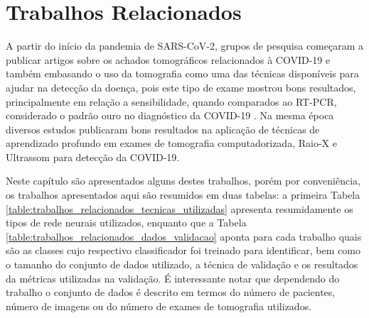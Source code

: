 \chapter{Trabalhos Relacionados} \label{cap:cap_trabalhos}

A partir do início da pandemia de SARS-CoV-2, grupos de pesquisa começaram a publicar artigos sobre os achados tomográficos relacionados à COVID-19 \cite{zhu2020ct} e também embasando o uso da tomografia como uma das técnicas disponíveis para ajudar na detecção da doença, pois este tipo de exame mostrou bons resultados, principalmente em relação a sensibilidade, quando comparados ao RT-PCR, considerado o padrão ouro no diagnóstico da COVID-19 \cite{fang2020sensitivity, long2020diagnosis}. Na mesma época diversos estudos publicaram bons resultados na aplicação de técnicas de aprendizado profundo em exames de tomografia computadorizada\cite{mei2020artificial, roberts2021common, lacerda2021hyperparameter}, Raio-X e Ultrassom \cite{barros2021pulmonary} para detecção da COVID-19. 

Neste capítulo são apresentados alguns destes trabalhos, porém por conveniência, os trabalhos apresentados aqui são resumidos em duas tabelas: a primeira Tabela \ref{table:trabalhos_relacionados_tecnicas_utilizadas} apresenta resumidamente os tipos de rede neurais utilizados, enquanto que a Tabela \ref{table:trabalhos_relacionados_dados_validacao} aponta para cada trabalho quais são as classes cujo respectivo classificador foi treinado para identificar, bem como o tamanho do conjunto de dados utilizado, a técnica de validação e os resultados da métricas utilizadas na validação. É interessante notar que dependendo do trabalho o conjunto de dados é descrito em termos do número de pacientes, número de imagens ou do número de exames de tomografia utilizados. 





